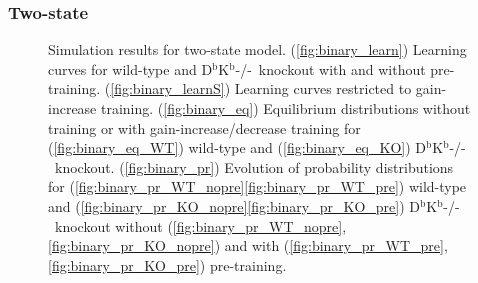 \documentclass[12pt]{article}
\newcommand{\KO}{D$^\mathrm{b}$K$^\mathrm{b}$-/-}
\begin{document}
\subsubsection{Two-state}\label{sec:binary}

\begin{figure}
 \begin{center}
 \begin{myenuma}
  \item{}\label{fig:binary_learn}
  \item{}\label{fig:binary_learnS}
  \item\label{fig:binary_eq}\begin{myenumi}
                    \item{}\label{fig:binary_eq_WT}
                    \item{}\label{fig:binary_eq_KO}
                  \end{myenumi}
  \item\label{fig:binary_pr}\begin{myenumi}
                    \item{}\label{fig:binary_pr_WT_nopre}
                    \item{}\label{fig:binary_pr_WT_pre}
                    \item{}\label{fig:binary_pr_KO_nopre}
                    \item{}\label{fig:binary_pr_KO_pre}
                  \end{myenumi}
 \end{myenuma}
 \end{center}
  \caption{Simulation results for two-state model.
  (\ref{fig:binary_learn}) Learning curves for wild-type and \KO\ knockout with and without pre-training.
  (\ref{fig:binary_learnS}) Learning curves restricted to gain-increase training.
  (\ref{fig:binary_eq}) Equilibrium distributions without training or with gain-increase/decrease training for (\ref{fig:binary_eq_WT}) wild-type and (\ref{fig:binary_eq_KO}) \KO\ knockout.
  (\ref{fig:binary_pr}) Evolution of probability distributions for (\ref{fig:binary_pr_WT_nopre}\ref{fig:binary_pr_WT_pre}) wild-type and  (\ref{fig:binary_pr_KO_nopre}\ref{fig:binary_pr_KO_pre}) \KO\ knockout without (\ref{fig:binary_pr_WT_nopre},\ref{fig:binary_pr_KO_nopre}) and with (\ref{fig:binary_pr_WT_pre},\ref{fig:binary_pr_KO_pre}) pre-training. } \label{fig:binary_res}
\end{figure}
\end{document}
